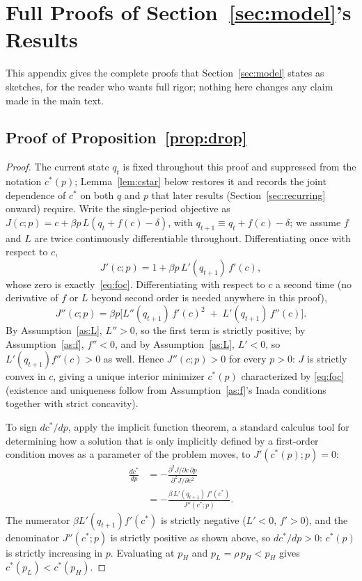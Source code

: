 \section{Full Proofs of Section~\ref{sec:model}'s Results}
\label{app:proofs}
This appendix gives the complete proofs that Section~\ref{sec:model} states as sketches, for the reader who wants full rigor; nothing here changes any claim made in the main text.

\subsection{Proof of Proposition~\ref{prop:drop}}
\begin{proof}
The current state $q_t$ is fixed throughout this proof and suppressed from the notation $c^*(p)$; Lemma~\ref{lem:cstar} below restores it and records the joint dependence of $c^*$ on both $q$ and $p$ that later results (Section~\ref{sec:recurring} onward) require. Write the single-period objective as $J(c;p) = c + \beta p\, L(q_t + f(c) - \delta)$, with $q_{t+1} \equiv q_t + f(c) - \delta$; we assume $f$ and $L$ are twice continuously differentiable throughout. Differentiating once with respect to $c$,
\[
J'(c;p) = 1 + \beta p\, L'(q_{t+1})\, f'(c),
\]
whose zero is exactly~\eqref{eq:foc}. Differentiating with respect to $c$ a second time (no derivative of $f$ or $L$ beyond second order is needed anywhere in this proof),
\[
J''(c;p) = \beta p \Big[ L''(q_{t+1})\, f'(c)^2 \;+\; L'(q_{t+1})\, f''(c) \Big].
\]
By Assumption~\ref{as:L}, $L'' > 0$, so the first term is strictly positive; by Assumption~\ref{as:f}, $f'' < 0$, and by Assumption~\ref{as:L}, $L' < 0$, so $L'(q_{t+1}) f''(c) > 0$ as well. Hence $J''(c;p) > 0$ for every $p > 0$: $J$ is strictly convex in $c$, giving a unique interior minimizer $c^*(p)$ characterized by \eqref{eq:foc} (existence and uniqueness follow from Assumption~\ref{as:f}'s Inada conditions together with strict concavity).

To sign $dc^*/dp$, apply the implicit function theorem, a standard calculus tool for determining how a solution that is only implicitly defined by a first-order condition moves as a parameter of the problem moves, to $J'(c^*(p);p) = 0$:
\begin{align*}
\frac{dc^*}{dp} &= -\frac{\partial^2 J / \partial c\, \partial p}{\partial^2 J/\partial c^2} \\
&= -\frac{\beta\, L'(q_{t+1})\, f'(c^*)}{J''(c^*;p)}.
\end{align*}
The numerator $\beta L'(q_{t+1}) f'(c^*)$ is strictly negative ($L' < 0$, $f' > 0$), and the denominator $J''(c^*;p)$ is strictly positive as shown above, so $dc^*/dp > 0$: $c^*(p)$ is strictly increasing in $p$. Evaluating at $p_H$ and $p_L = \rho\, p_H < p_H$ gives $c^*(p_L) < c^*(p_H)$.
\end{proof}

